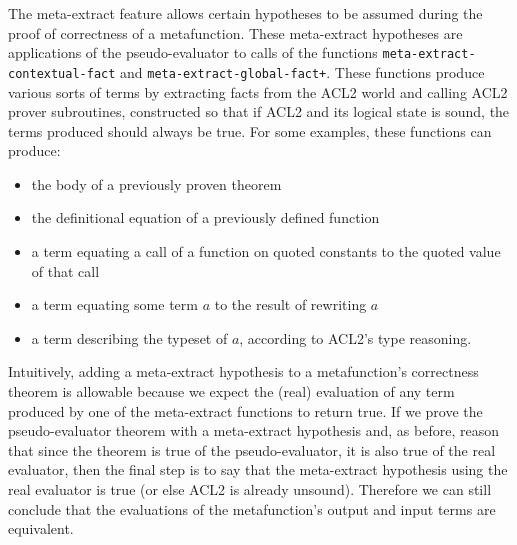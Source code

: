 The meta-extract feature allows certain hypotheses to be assumed
during the proof of correctness of a metafunction.  These meta-extract
hypotheses are applications of the pseudo-evaluator to calls of the
functions
\texttt{meta-extract-contextual-fact} and
\texttt{meta-extract-global-fact+}.  These functions produce various
sorts of terms by extracting facts from the ACL2 world and calling
ACL2 prover subroutines, constructed so that if ACL2 and its logical
state is sound, the terms produced should always be true.  For some
examples, these functions can produce:
\begin{itemize}
\item the body of a previously proven theorem
\item the definitional equation of a previously defined function
\item a term equating a call of a function on quoted constants to the
  quoted value of that call
\item a term equating some term $a$ to the result of rewriting $a$
\item a term describing the typeset of $a$, according to ACL2's type
  reasoning.
\end{itemize}

Intuitively, adding a meta-extract hypothesis to a metafunction's
correctness theorem is allowable because we expect the (real)
evaluation of any term produced by one of the meta-extract functions
to return true.  If we prove the pseudo-evaluator theorem with a
meta-extract hypothesis and, as before, reason that since the theorem
is true of the pseudo-evaluator, it is also true of the real
evaluator, then the final step is to say that the meta-extract
hypothesis using the real evaluator is true (or else ACL2 is already
unsound).  Therefore we can still conclude that the evaluations of the
metafunction's output and input terms are equivalent.



